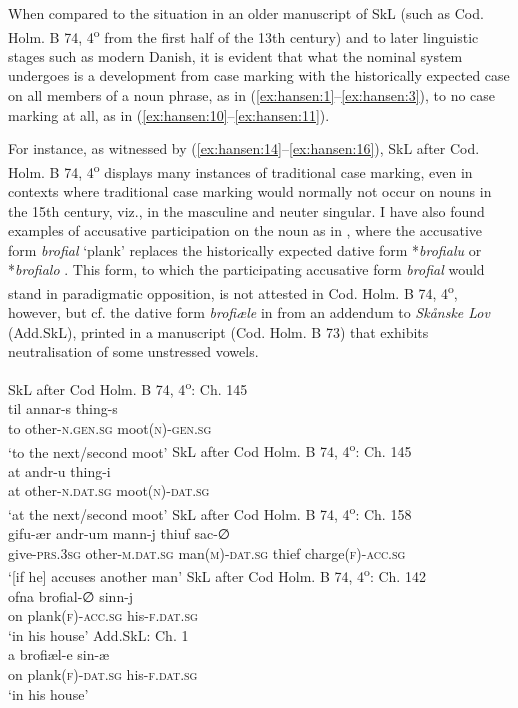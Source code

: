 \documentclass[output=paper]{langsci/langscibook}
\begin{document}
When compared to the situation in an older manuscript of SkL (such as Cod. Holm. B 74, 4\textsuperscript{o} from the first half of the 13th century) and to later linguistic stages such as modern Danish, it is evident that what the nominal system undergoes is a development from case marking with the historically expected case on all members of a noun phrase, as in (\ref{ex:hansen:1}--\ref{ex:hansen:3}), to no case marking at all, as in (\ref{ex:hansen:10}--\ref{ex:hansen:11}).

For instance, as witnessed by (\ref{ex:hansen:14}--\ref{ex:hansen:16}), SkL after Cod. Holm. B 74, 4\textsuperscript{o} displays many instances of traditional case marking, even in contexts where traditional case marking would normally not occur on nouns in the 15th century, viz., in the masculine and neuter singular. I have also found examples of accusative participation on the noun as in , where the accusative form \textit{brofial} ‘plank’ replaces the historically expected dative form *\textit{brofialu} or *\textit{brofialo} \citep[39]{Bjerrum1966}. This form, to which the participating accusative form \textit{brofial} would stand in paradigmatic opposition, is not attested in Cod. Holm. B 74, 4\textsuperscript{o}, however, but cf. the dative form \textit{brofiæle} in  from an addendum to \textit{Skånske Lov} (Add.SkL), printed in a manuscript (Cod. Holm. B 73) that exhibits neutralisation of some unstressed vowels.

\ea \label{ex:hansen:14}
{SkL after Cod Holm. B 74, 4\textsuperscript{o}: Ch. 145} \\ 
\gll til annar-s thing-s\\
     to other-\textsc{n.gen.sg} moot\textsc{(n)-gen.sg}\\
\glt ‘to the next/second moot’
\ex \label{ex:hansen:15}
{SkL after Cod Holm. B 74, 4\textsuperscript{o}: Ch. 145} \\ 
\gll at andr-u thing-i\\
     at other-\textsc{n.dat.sg} moot\textsc{(n)-dat.sg}\\
\glt ‘at the next/second moot’
\ex \label{ex:hansen:16}
{SkL after Cod Holm. B 74, 4\textsuperscript{o}: Ch. 158} \\
\gll gifu-ær andr-um mann-j thiuf sac-∅\\
     give-\textsc{prs.3sg} other-\textsc{m.dat.sg} man\textsc{(m)-dat.sg} thief charge\textsc{(f)-acc.sg}\\
\glt ‘[if he] accuses another man’
\ex \label{ex:hansen:17}
{SkL after Cod Holm. B 74, 4\textsuperscript{o}: Ch. 142} \\
\gll ofna brofial-∅ sinn-j\\
     on plank\textsc{(f)-acc.sg} his\textsc{{}-f.dat.sg}\\
\glt ‘in his house’
\ex \label{ex:hansen:18}
{Add.SkL: Ch. 1}\\
\gll a brofiæl-e sin-æ\\
     on plank\textsc{(f)-dat.sg} his\textsc{{}-f.dat.sg}\\
\glt ‘in his house’
\z
\end{document}

